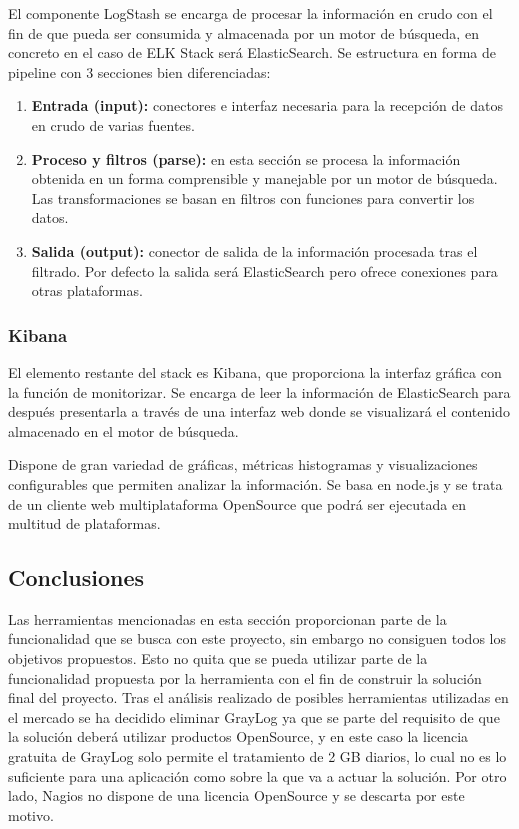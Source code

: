 El componente LogStash  se encarga de procesar la información en crudo con el fin de que pueda ser consumida y almacenada por un motor de búsqueda, en concreto en el caso de ELK Stack será ElasticSearch. Se estructura en forma de pipeline con 3 secciones bien diferenciadas:

\begin{enumerate}
\item \textbf{Entrada (input):} conectores e interfaz necesaria para la recepción de datos en crudo de varias fuentes.
\item \textbf{Proceso y filtros (parse):} en esta sección se procesa la información obtenida en un forma comprensible y manejable por un motor de búsqueda. Las transformaciones se basan en filtros con funciones para convertir los datos.
\item \textbf{Salida (output):} conector de salida de la información procesada tras el filtrado. Por defecto la salida será ElasticSearch pero ofrece conexiones para otras plataformas.
\end{enumerate}

\subsubsection{Kibana}

El elemento restante del stack es Kibana, que proporciona la interfaz gráfica con la función de monitorizar. Se encarga de leer la información de ElasticSearch para después presentarla a través de una interfaz web donde se visualizará el contenido almacenado en el motor de búsqueda.

Dispone de gran variedad de gráficas, métricas histogramas y visualizaciones configurables que permiten analizar la información. Se basa en node.js y se trata de un cliente web multiplataforma OpenSource que podrá ser ejecutada en multitud de plataformas.


\subsection{Conclusiones}

Las herramientas mencionadas en esta sección proporcionan parte de la funcionalidad que se busca con este proyecto, sin embargo no consiguen todos los objetivos propuestos. Esto no quita que se pueda utilizar parte de la funcionalidad propuesta por la herramienta con el fin de construir la solución final del proyecto. Tras el análisis realizado de posibles herramientas utilizadas en el mercado se ha decidido eliminar GrayLog ya que se parte del requisito de que la solución deberá utilizar productos OpenSource, y en este caso la licencia gratuita de GrayLog solo permite el tratamiento de 2 GB diarios, lo cual no es lo suficiente para una aplicación como sobre la que va a actuar la solución. Por otro lado, Nagios no dispone de una licencia OpenSource y se descarta por este motivo.

